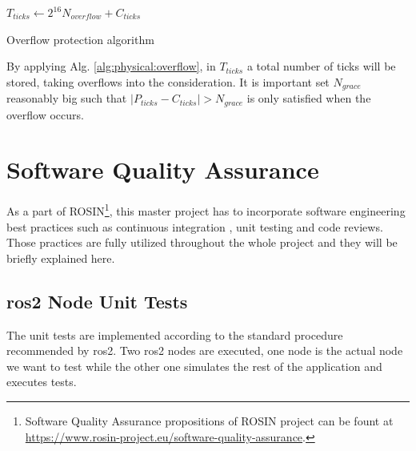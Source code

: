 \vspace*{.4cm}
\begin{algorithm}[H]

$ T_{ticks} \leftarrow 2^{16} N_{overflow} + C_{ticks} $\;

\caption{Overflow protection algorithm}
\label{alg:physical:overflow}
\end{algorithm}
\vspace*{.4cm}

By applying Alg. \ref{alg:physical:overflow}, in $ T_{ticks} $ a total number of ticks will be stored, taking overflows into the consideration. It is important set $ N_{grace} $ reasonably big such that $ |P_{ticks} - C_{ticks}| > N_{grace} $ is only satisfied when the overflow occurs.

\section{Software Quality Assurance}
As a part of ROSIN\footnote{Software Quality Assurance propositions of ROSIN project can be fount at \url{https://www.rosin-project.eu/software-quality-assurance}.}, this master project has to incorporate software engineering best practices such as continuous integration \cite{meyer_continuous_2014}, unit testing and code reviews. Those practices are fully utilized throughout the whole project and they will be briefly explained here.

\subsection{\ac{ros2} Node Unit Tests}

The unit tests are implemented according to the standard procedure recommended by \ac{ros2}. Two \ac{ros2} nodes are executed, one node is the actual node we want to test while the other one simulates the rest of the application and executes tests. 

